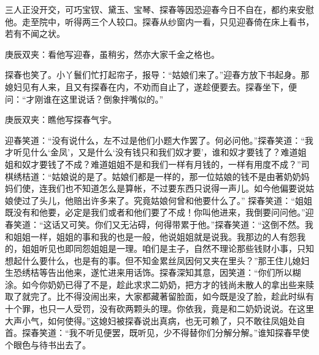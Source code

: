 \begin{parag}
    三人正没开交，可巧宝钗、黛玉、宝琴、探春等因恐迎春今日不自在，都约来安慰他。走至院中，听得两三个人较口。探春从纱窗内一看，只见迎春倚在床上看书，若有不闻之状。\begin{note}庚辰双夹：看他写迎春，虽稍劣，然亦大家千金之格也。\end{note}探春也笑了。小丫鬟们忙打起帘子，报导：“姑娘们来了。”迎春方放下书起身。那媳妇见有人来，且又有探春在内，不劝而自止了，遂趁便要去。探春坐下，便问：“才刚谁在这里说话？倒象拌嘴似的。”\begin{note}庚辰双夹：瞧他写探春气宇。\end{note}迎春笑道：“没有说什么，左不过是他们小题大作罢了。何必问他。”探春笑道：“我才听见什么‘金凤’，又是什么‘没有钱只和我们奴才要’，谁和奴才要钱了？难道姐姐和奴才要钱了不成？难道姐姐不是和我们一样有月钱的，一样有用度不成？”司棋绣桔道：“姑娘说的是了。姑娘们都是一样的，那一位姑娘的钱不是由著奶奶妈妈们使，连我们也不知道怎么是算帐，不过要东西只说得一声儿。如今他偏要说姑娘使过了头儿，他赔出许多来了。究竟姑娘何曾和他要什么了。” 探春笑道：“姐姐既没有和他要，必定是我们或者和他们要了不成！你叫他进来，我倒要问问他。”迎春笑道：“这话又可笑。你们又无沾碍，何得带累于他。”探春笑道：“这倒不然。我和姐姐一样，姐姐的事和我的也是一般，他说姐姐就是说我。我那边的人有怨我的，姐姐听见也即同怨姐姐是一理。咱们是主子，自然不理论那些钱财小事，只知想起什么要什么，也是有的事。但不知金累丝凤因何又夹在里头？”那王住儿媳妇生恐绣桔等告出他来，遂忙进来用话饰。探春深知其意，因笑道：“你们所以糊涂。如今你奶奶已得了不是，趁此求求二奶奶，把方才的钱尚未散人的拿出些来赎取了就完了。比不得没闹出来，大家都藏著留脸面，如今既是没了脸，趁此时纵有十个罪，也只一人受罚，没有砍两颗头的理。你依我，竟是和二奶奶说说。在这里大声小气，如何使得。”这媳妇被探春说出真病，也无可赖了，只不敢往凤姐处自首。探春笑道：“我不听见便罢，既听见，少不得替你们分解分解。”谁知探春早使个眼色与待书出去了。
\end{parag}


